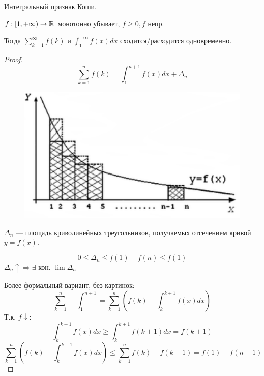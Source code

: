 

\cfoot{}

\renewcommand{\thesubsection}{\arabic{subsection}.}



\begin{theorem}
    Интегральный признак Коши.

    $f:[1, +\infty)\to\mathbb{R}$ монотонно убывает, $f\geq 0, f$ непр.

    Тогда $\sum_{k=1}^\infty f(k)$ и $\int_1^{+\infty} f(x)dx$ сходится/расходится одновременно.
\end{theorem}
\begin{proof}
    $$\sum_{k=1}^n f(k) = \int_1^{n+1} f(x)dx + \Delta_n$$
    \begin{figure}[h]
        \includegraphics[scale=0.6]{images/cauchy.pdf}
        \centering
    \end{figure}

    $\Delta_n$ --- площадь криволинейных треугольников, получаемых отсечением кривой $y=f(x)$.

    $$0 \le \Delta_n \le f(1) - f(n) \le f(1)$$
    $\Delta_n\uparrow \Rightarrow \exists$ кон. $\lim \Delta_n$

    Более формальный вариант, без картинок:
    $$\sum_{k=1}^n - \int_1^{n+1} = \sum_{k=1}^n\left(f(k) - \int_k^{k+1} f(x)dx \right)$$
    Т.к. $f\downarrow$:
    $$\int_k^{k+1} f(x)dx \ge \int_k^{k+1} f(k+1)dx=f(k+1)$$
    $$\sum_{k=1}^n\left(f(k) - \int_k^{k+1} f(x)dx \right) \le \sum_{k=1}^n f(k) - f(k+1) = f(1) - f(n+1)$$
\end{proof}

